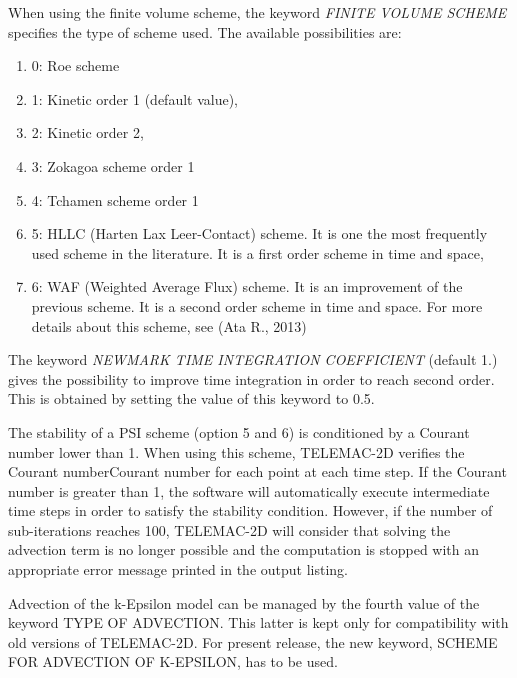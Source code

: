  When using the finite volume scheme, the keyword \textit{FINITE VOLUME SCHEME} specifies the type of scheme used. The available possibilities are:

\begin{enumerate}
\item [\nonumber]  0: Roe scheme

\item [\nonumber]  1: Kinetic order 1 (default value),

\item [\nonumber]  2: Kinetic order 2,

\item [\nonumber]  3: Zokagoa scheme order 1

\item [\nonumber]  4: Tchamen scheme order 1

\item [\nonumber]  5: HLLC (Harten Lax Leer-Contact) scheme. It is one the most frequently used scheme in the literature. It is a first order scheme in time and space,

\item [\nonumber]  6: WAF (Weighted Average Flux) scheme. It is an improvement of the previous scheme. It is a second order scheme in time and space. For more details about this scheme, see (Ata R., 2013)
\end{enumerate}

 The keyword \textit{NEWMARK TIME INTEGRATION COEFFICIENT} (default 1.) gives the possibility to improve time integration in order to reach second order. This is obtained by setting the value of this keyword to 0.5.

 The stability of a PSI scheme (option 5 and 6) is conditioned by a Courant number lower than 1. When using this scheme, TELEMAC-2D verifies the Courant numberCourant number for each point at each time step. If the Courant number is greater than 1, the software will automatically execute intermediate time steps in order to satisfy the stability condition. However, if the number of sub-iterations reaches 100, TELEMAC-2D will consider that solving the advection term is no longer possible and the computation is stopped with an appropriate error message printed in the output listing.

 Advection of the k-Epsilon model can be managed by the fourth value of the keyword TYPE OF ADVECTION. This latter is kept only for compatibility with old versions of TELEMAC-2D. For present release, the new keyword, SCHEME FOR ADVECTION OF K-EPSILON, has to be used.


